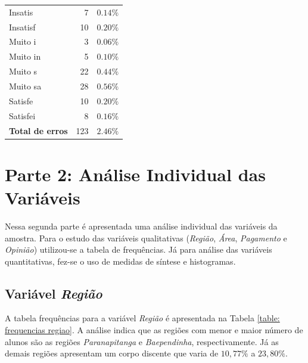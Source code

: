 \documentclass[10pt,a4paper,oneside]{article}
\newcommand{\baep}{Baependinha\xspace}
\newcommand{\para}{Paranapitanga\xspace}
\begin{document}
\begin{table}[!h]
\begin{minipage}[t]{0.49\textwidth}
\begin{tabular}{l r r}
	Insatis    & 7   & $0.14\%$ \\
	Insatisf   & 10  & $0.20\%$ \\
	Muito i    & 3   & $0.06\%$ \\
	Muito in   & 5   & $0.10\%$ \\
	Muito s    & 22  & $0.44\%$ \\
	Muito sa   & 28  & $0.56\%$ \\
	Satisfe    & 10  & $0.20\%$ \\
	Satisfei   & 8   & $0.16\%$ \\	
	\midrule
	\textbf{Total de erros}  & 123  & $2.46\%$ \\	
	\bottomrule
\end{tabular}
\end{minipage}
\end{table}


\begin{table}[!h]
\centering

\end{table}

\FloatBarrier

\clearpage
\section*{Parte 2: Análise Individual das Variáveis}

Nessa segunda parte é apresentada uma análise individual das variáveis da amostra. Para o estudo das variáveis qualitativas (\textit{Região}, \textit{Área}, \textit{Pagamento} e \textit{Opinião}) utilizou-se a tabela de frequências. Já para análise das variáveis quantitativas, fez-se o uso de medidas de síntese e histogramas.

\subsection*{Variável \textit{Região}}

A tabela frequências para a variável \textit{Região} é apresentada na Tabela \ref{table: frequencias regiao}. A análise indica que as regiões com menor e maior número de alunos são as regiões \textit{\para} e \textit{\baep}, respectivamente. Já as demais regiões apresentam um corpo discente que varia de $10,77\%$ a $23,80\%$.
\end{document}
